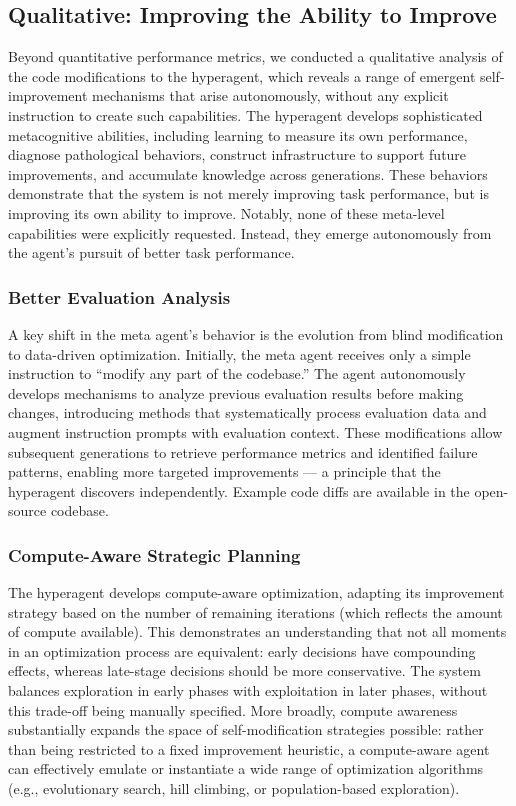 \subsection{Qualitative: Improving the Ability to Improve}
\label{app:qual-meta}

Beyond quantitative performance metrics, we conducted a qualitative analysis of the code modifications to the hyperagent, which reveals a range of emergent self-improvement mechanisms that arise autonomously, without any explicit instruction to create such capabilities. The hyperagent develops sophisticated metacognitive abilities, including learning to measure its own performance, diagnose pathological behaviors, construct infrastructure to support future improvements, and accumulate knowledge across generations. These behaviors demonstrate that the system is not merely improving task performance, but is improving its own ability to improve. Notably, none of these meta-level capabilities were explicitly requested. Instead, they emerge autonomously from the agent's pursuit of better task performance.

\subsubsection{Better Evaluation Analysis}

A key shift in the meta agent's behavior is the evolution from blind modification to data-driven optimization. Initially, the meta agent receives only a simple instruction to ``modify any part of the codebase.'' The agent autonomously develops mechanisms to analyze previous evaluation results before making changes, introducing methods that systematically process evaluation data and augment instruction prompts with evaluation context. These modifications allow subsequent generations to retrieve performance metrics and identified failure patterns, enabling more targeted improvements --- a principle that the hyperagent discovers independently. Example code diffs are available in the open-source codebase.

\subsubsection{Compute-Aware Strategic Planning}

The hyperagent develops compute-aware optimization, adapting its improvement strategy based on the number of remaining iterations (which reflects the amount of compute available). This demonstrates an understanding that not all moments in an optimization process are equivalent: early decisions have compounding effects, whereas late-stage decisions should be more conservative. The system balances exploration in early phases with exploitation in later phases, without this trade-off being manually specified. More broadly, compute awareness substantially expands the space of self-modification strategies possible: rather than being restricted to a fixed improvement heuristic, a compute-aware agent can effectively emulate or instantiate a wide range of optimization algorithms (e.g., evolutionary search, hill climbing, or population-based exploration).

